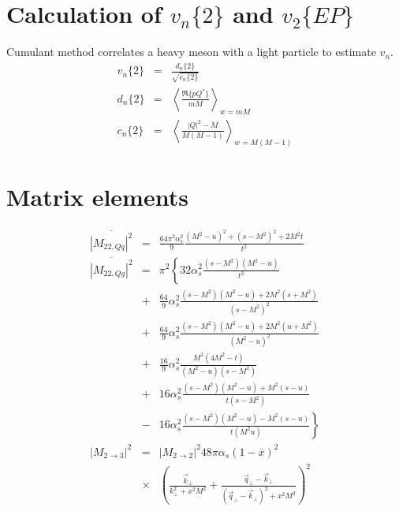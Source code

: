 \documentclass[aps, prc, reprint, amsmath, groupedaddress, nofootinbib]{revtex4-1}
\begin{document}
\begin{appendices}
\section{Calculation of $v_n\{2\}$ and $v_2\{EP\}$}
Cumulant method correlates a heavy meson with a light particle to estimate $v_n$. 
\begin{eqnarray}
v_n\{2\} &=& \frac{d_n\{2\}}{\sqrt{c_n\{2\}} } \\
d_n\{2\} &=& \left\langle \frac{\Re\{pQ^*\}}{mM} \right\rangle_{w = mM} \\
c_n\{2\} &=& \left\langle \frac{|Q|^2-M}{M(M-1)} \right\rangle_{w = M(M-1)}
\end{eqnarray}

\section{Matrix elements}
\label{appendix:matrix-element}
\begin{eqnarray}
\overline{|M_{22,Qq}|^2} &=& \frac{64\pi^2\alpha_s^2}{9} \frac{(M^2-u)^2 + (s-M^2)^2 + 2 M^2 t}{t^2}
\nonumber
\\
\overline{|M_{22,Qg}|^2} &=& \pi^2 \left\{
32\alpha_s^2 \frac{(s-M^2)(M^2-u)}{t^2} \right.
\nonumber
\\
&+&\frac{64}{9}\alpha_s^2 \frac{(s-M^2)(M^2-u)+2M^2(s+M^2)}{(s-M^2)^2} \nonumber
\\
&+&\frac{64}{9}\alpha_s^2 \frac{(s-M^2)(M^2-u)+2M^2(u+M^2)}{(M^2-u)^2} \nonumber
\\
&+& \frac{16}{9}\alpha_s^2 \frac{M^2(4M^2 - t)}{(M^2-u)(s-M^2)} 
\nonumber
\\
&+& 16 \alpha_s^2 \frac{(s-M^2)(M^2-u)+M^2(s-u)}{t(s-M^2)}
\nonumber
\\
&-& \left. 16 \alpha_s^2 \frac{(s-M^2)(M^2-u)-M^2(s-u)}{t(M^2u)}\right\}
\nonumber
\\
|M_{2\rightarrow 3}|^2 &=& |M_{2\rightarrow 2}|^2 48 \pi \alpha_s (1-\bar{x})^2
\nonumber
\\
&\times&\left(\frac{\vec{k}_\perp}{k_\perp^2 + x^2 M^2} + \frac{\vec{q}_\perp - \vec{k}_\perp}{(\vec{q}_\perp-\vec{k}_\perp)^2 + x^2 M^2}
\right)^2 
\end{eqnarray}

\end{appendices}
\end{document}
